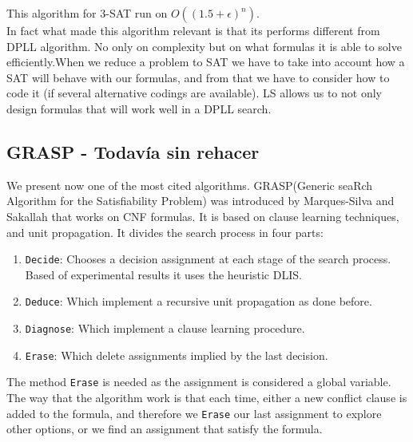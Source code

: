 This algorithm for $3$-SAT run on $O((1.5 + \epsilon)^n)$\cite{dantsin2000deterministic}.\\


In fact what made this algorithm relevant is that its performs different from DPLL algorithm. No only on complexity but on what formulas it is able to solve efficiently.When we reduce a problem to SAT we have to take into account how a SAT will behave with our formulas, and from that we have to consider how to code it (if several alternative codings are available). LS allows us to not only design formulas that will work well in a DPLL search. \\


  
\subsection{GRASP - Todavía sin rehacer }
\label{sub:grasp}
We present now one of the most cited algorithms.  GRASP(Generic seaRch Algorithm for the Satisfiability Problem) was introduced by Marques-Silva and Sakallah\cite{marques1999grasp} that works on CNF formulas. It is based on clause learning techniques, and unit propagation. It divides the search process in four parts:

\begin{enumerate}
\item \texttt{Decide}: Chooses a decision assignment at each stage of the search process. Based of experimental results it uses the heuristic DLIS.
\item \texttt{Deduce}: Which implement a recursive unit propagation as done before.
\item \texttt{Diagnose}: Which implement a clause learning procedure.
\item \texttt{Erase}: Which delete assignments implied by the last decision.
\end{enumerate}


The method \texttt{Erase} is needed as the assignment is considered a global variable. The way that the algorithm work is that each time, either a new conflict clause is added to the formula, and therefore we \texttt{Erase} our last assignment to explore other options, or we find an assignment that satisfy the formula.




